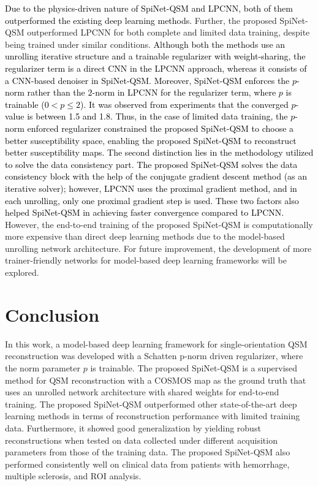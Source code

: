 \documentclass[sn-vancouver,Numbered]{sn-jnl}%
\begin{document}
\noindent \textcolor{black}{Due to the physics-driven nature of SpiNet-QSM and LPCNN, both of them outperformed the existing deep learning methods.} Further, the proposed SpiNet-QSM outperformed LPCNN for both complete and limited data training, despite being trained under similar conditions. \textcolor{black}{Although both the methods use an unrolling iterative structure and a trainable regularizer with weight-sharing, the regularizer term is a direct CNN in the LPCNN approach, whereas it consists of a CNN-based denoiser in SpiNet-QSM. Moreover, SpiNet-QSM enforces the $p$-norm rather than the $2$-norm in LPCNN for the regularizer term, where $ p $ is trainable ($0 < p \le 2$). It was observed from experiments that the converged $p$-value is between 1.5 and 1.8. Thus, in the case of limited data training, the $p$-norm enforced regularizer constrained the proposed SpiNet-QSM to choose a better susceptibility space, enabling the proposed SpiNet-QSM to reconstruct better susceptibility maps. The second distinction lies in the methodology utilized to solve the data consistency part. The proposed SpiNet-QSM solves the data consistency block with the help of the conjugate gradient descent method (as an iterative solver); however, LPCNN uses the proximal gradient method, and in each unrolling, only one proximal gradient step is used. These two factors also helped SpiNet-QSM in achieving faster convergence compared to LPCNN.} However, the end-to-end training of the proposed SpiNet-QSM is computationally more expensive than direct deep learning methods due to the model-based unrolling network architecture. For future improvement, the development of more trainer-friendly networks for model-based deep learning frameworks will be explored.


\section{Conclusion}


In this work, a model-based deep learning framework for single-orientation QSM reconstruction was developed with a Schatten p-norm driven regularizer, where the norm parameter $p$ is trainable.  The proposed SpiNet-QSM is a supervised method for QSM reconstruction with a COSMOS map as the ground truth that uses an unrolled network architecture with shared weights for end-to-end training. The proposed SpiNet-QSM outperformed other state-of-the-art deep learning methods in terms of reconstruction performance with limited training data.  Furthermore, it showed good generalization by yielding robust reconstructions when tested on data collected under different acquisition parameters from those of the training data. The proposed SpiNet-QSM also performed consistently well on clinical data from patients with hemorrhage, multiple sclerosis, and ROI analysis.
\end{document}
